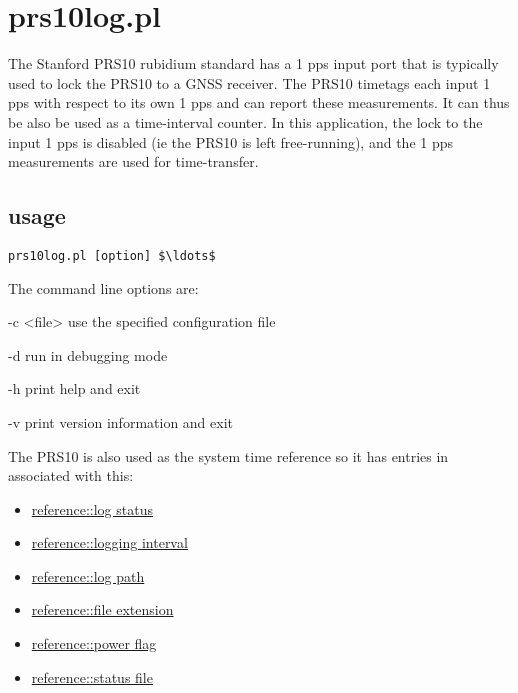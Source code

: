 \section{prs10log.pl}

\hypertarget{h:prs10log}{}

The Stanford PRS10 rubidium standard has a 1 pps input port that is typically used
to lock the PRS10 to a GNSS receiver. The PRS10 timetags each input 1 pps with respect to its own 1 pps and can report these measurements. It can thus be also be used as a time-interval counter. 
In this application, the lock to the input 1 pps is disabled 
(ie the PRS10 is left free-running),
and the 1 pps measurements are used for time-transfer.

\subsection{usage}

\begin{lstlisting}[mathescape=true]
prs10log.pl [option] $\ldots$ 
\end{lstlisting}

The command line options are:
\begin{description*}
	\item[-c \textless file\textgreater] use the specified configuration file
	\item[-d]	run in debugging mode
	\item[-h]	print help and exit
	\item[-v]	print version information and exit
\end{description*}

The PRS10 is also used as the system time reference so it has
entries in  associated with this:
\begin{itemize}
	\item \hyperlink{h:reference_log_status}{reference::log status}
	\item \hyperlink{h:reference_logging_interval}{reference::logging interval}
	\item \hyperlink{h:reference_log_path}{reference::log path}
	\item \hyperlink{h:reference_file_extension}{reference::file extension}
	\item \hyperlink{h:reference_power_flag}{reference::power flag}
	\item \hyperlink{h:reference_status_file}{reference::status file}
\end{itemize}
